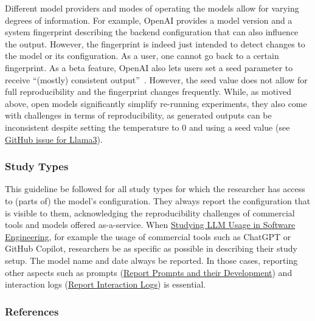 Different model providers and modes of operating the models allow for varying degrees of information.
For example, OpenAI provides a model version and a system fingerprint describing the backend configuration that can also influence the output.
However, the fingerprint is indeed just intended to detect changes to the model or its configuration.
As a user, one cannot go back to a certain fingerprint.
As a beta feature, OpenAI also lets users set a seed parameter to receive ``(mostly) consistent output''~\cite{OpenAI23}.
However, the seed value does not allow for full reproducibility and the fingerprint changes frequently. 
While, as motived above, open models significantly simplify re-running experiments, they also come with challenges in terms of reproducibility, as generated outputs can be inconsistent despite setting the temperature to 0 and using a seed value (see \href{https://github.com/ollama/ollama/issues/5321}{GitHub issue for Llama3}).

\subsubsection{Study Types}

This guideline \must be followed for all study types for which the researcher has access to (parts of) the model's configuration.
They \must always report the configuration that is visible to them, acknowledging the reproducibility challenges of commercial tools and models offered as-a-service. 
When \href{/study-types/#studying-llm-usage-in-software-engineering}{Studying LLM Usage in Software Engineering}, for example the usage of commercial tools such as ChatGPT or GitHub Copilot, researchers \must be as specific as possible in describing their study setup.
The model name and date \must always be reported.
In those cases, reporting other aspects such as prompts (\href{/guidelines/#report-prompts-and-their-development}{Report Prompts and their Development}) and interaction logs (\href{/guidelines//#report-interaction-logs}{Report Interaction Logs}) is essential.


\subsubsection{References}





